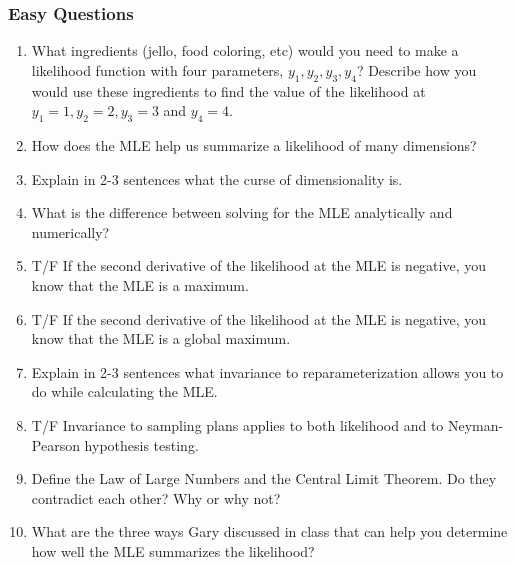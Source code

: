 \documentclass[11pt]{article}
\begin{document}
\subsubsection{Easy Questions}
\begin{enumerate}
\item What ingredients (jello, food coloring, etc) would you need to make a likelihood function with four parameters, $y_1, y_2, y_3, y_4$?  Describe how you would use these ingredients to find the value of the likelihood at $y_1=1, y_2=2, y_3=3$ and $y_4=4$. 

\item How does the MLE help us summarize a likelihood of many dimensions?  

\item Explain in 2-3 sentences what the curse of dimensionality is. 

\item What is the difference between solving for the MLE analytically and numerically? 

\item T/F If the second derivative of the likelihood at the MLE is negative, you know that the MLE is a maximum. 

\item T/F If the second derivative of the likelihood at the MLE is negative, you know that the MLE is a global maximum. 

\item Explain in 2-3 sentences what invariance to reparameterization allows you to do while calculating the MLE. 

\item T/F Invariance to sampling plans applies to both likelihood and to Neyman-Pearson hypothesis testing. 

\item Define the Law of Large Numbers and the Central Limit Theorem.  Do they contradict each other?  Why or why not? 

\item What are the three ways Gary discussed in class that can help you determine how well the MLE summarizes the likelihood? 


\end{enumerate}
\end{document}
